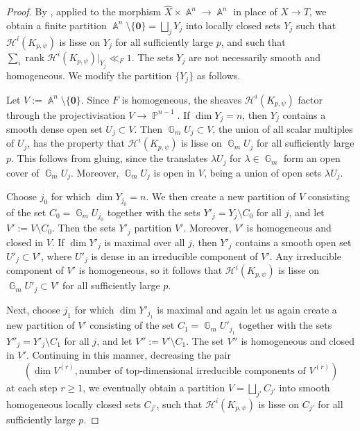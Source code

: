 \documentclass[a4paper,11pt, twoside,reqno]{amsart}
\theoremstyle{plain}
\theoremstyle{definition}
\theoremstyle{remark}
\DeclareMathOperator{\rank}{rank}
\DeclareMathOperator{\GG}{\mathbb{G}}
\DeclareMathOperator{\A}{\mathbb{A}}
\DeclareMathOperator{\PP}{\mathbb{P}}
\renewcommand{\ge}{\geqslant}
\newcommand{\cone}{\widehat}
\numberwithin{equation}{section}
\begin{document}
\begin{proof}
By \cite[Theorem~2.1]{FK01}, applied to the morphism
$\cone X\times\A^n \to \A^n$
in place of $X\to T$,
we obtain a finite partition $\A^n\setminus \{\bm0\} = \bigsqcup_j Y_j$
into locally closed sets $Y_j$
such that $\mathcal H^i(K_{p,\psi})$ is lisse on $Y_j$
for all sufficiently large $p$,
and such that $\sum_i \rank \mathcal H^i(K_{p,\psi})\vert_{Y_j} \ll_F 1$.
The sets $Y_j$
are not necessarily smooth and homogeneous.
We modify the partition $\{Y_j\}$ as follows.

Let $V := \A^n \setminus \{\bm0\}$.
Since $F$ is homogeneous,
the sheaves $\mathcal H^i(K_{p,\psi})$
factor through the projectivisation $V \to \PP^{n-1}$.
If $\dim Y_j = n$, then $Y_j$ contains a smooth dense open set $U_j \subset V$.
Then $\GG_m U_j\subset V$,
the union of all scalar multiples of $U_j$,
has the property that
$\mathcal H^i(K_{p,\psi})$ is lisse on $\GG_m U_j$
for all sufficiently large $p$.
This follows from gluing,
since the translates $\lambda U_j$ for $\lambda\in \GG_m$
form an open cover of $\GG_m U_j$.
Moreover, $\GG_m U_j$ is open in $V$, being a union of open sets $\lambda U_j$.

Choose $j_0$ for which $\dim Y_{j_0} = n$.
We then create a new partition of $V$
consisting of the set $C_0 = \GG_m U_{j_0}$
together with the sets $Y'_j = Y_j \setminus C_0$ for all $j$,
and let $V' := V \setminus C_0$.
Then the sets $Y'_j$ partition $V'$.
Moreover, $V'$ is homogeneous and closed in $V$.
If $\dim Y'_j$ is maximal over all $j$,
then $Y'_j$ contains a smooth open set $U'_j \subset V'$,
where $U'_j$ is dense in an irreducible component of $V'$.
Any irreducible component of $V'$ is homogeneous, so it follows that
$\mathcal H^i(K_{p,\psi})$ is lisse on $\GG_m U'_j \subset V'$
for all sufficiently large $p$.

Next, choose $j_1$ for which $\dim Y'_{j_1}$ is maximal and again let us again create a new partition of $V'$
consisting of the set $C_1 = \GG_m U'_{j_1}$
together with the sets $Y''_j = Y'_j \setminus C_1$ for all $j$,
and let $V'' := V' \setminus C_1$.
The set $V''$ is homogeneous and closed in $V'$.
Continuing in this manner,
decreasing the pair
$$(\dim V^{(r)},\text{number of top-dimensional irreducible components of }V^{(r)})$$
at each step $r\ge 1$,
we eventually obtain a partition
$V = \bigsqcup_{j'} C_{j'}$ into smooth homogeneous locally closed sets $C_{j'}$,
such that $\mathcal H^i(K_{p,\psi})$ is lisse on $C_{j'}$
for all sufficiently large $p$.
\end{proof}
\end{document}
